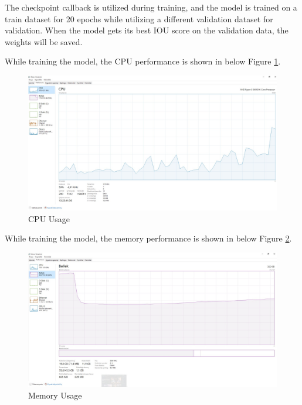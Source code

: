 \documentclass[conference]{IEEEtran}
\begin{document}
The checkpoint callback is utilized during training, and the model is trained on a train dataset for 20 epochs while utilizing a different validation dataset  for validation. When the model gets its best IOU score on the validation data, the weights will be saved.

While training the model, the CPU performance is shown in below Figure \ref{performance_cpu}. 
\begin{figure}[!htbp]
    \centering
    \includegraphics[scale=0.125]{images/performance_cpu.jpeg}
    \caption{CPU Usage}
    \label{performance_cpu}
\end{figure}

While training the model, the memory performance is shown in below Figure \ref{performance_memory}. 
\begin{figure}[!htbp]
    \centering
    \includegraphics[scale=0.125]{images/performance_memory.jpeg}
    \caption{Memory Usage}
    \label{performance_memory}
\end{figure}
\end{document}
